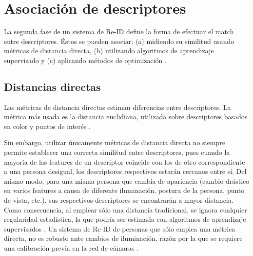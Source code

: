 \documentclass[../memoria.tex]{subfiles}
\begin{document}
\section{Asociación de descriptores}

La segunda fase de un sistema de Re-ID define la forma de efectuar el match entre descriptores. Éstos se pueden asociar: (a) midiendo su similitud usando métricas de distancia directa, (b) utilizando algoritmos de aprendizaje supervisado y (c) aplicando métodos de optimización \cite{mazzon2012person}.
 
\subsection{Distancias directas}
Las métricas de distancia directas estiman diferencias entre descriptores. La métrica más usada es la distancia euclidiana, utilizada sobre descriptores basados en color \cite{farenzena2010person, bak2010person} y puntos de interés \cite{gheissari2006person}. 



\indent Sin embargo, utilizar únicamente métricas de distancia directa no siempre permite establecer una correcta similitud entre descriptores, pues cuando la mayoría de las features de un descriptor coincide con los de otro correspondiente a una persona desigual, los descriptores respectivos estarán cercanos entre sí. Del mismo modo, para una misma persona que cambia de apariencia (cambio drástico en varios features a causa de diferente iluminación, postura de la persona, punto de vista, etc.), sus respectivos descriptores se encontrarán a mayor distancia. Como consecuencia, al emplear sólo una distancia tradicional, se ignora cualquier regularidad estadística, la que podría ser estimada con algoritmos de aprendizaje supervisados \cite{zheng2011person, prosser2010person}. Un sistema de Re-ID de personas que sólo emplea una métrica directa, no es robusto ante cambios de iluminación, razón por la que se requiere una calibración previa en la red de cámaras \cite{gilbert2006tracking, porikli2003multi, stein1999tracking, javed2008modeling}. %
\end{document}
